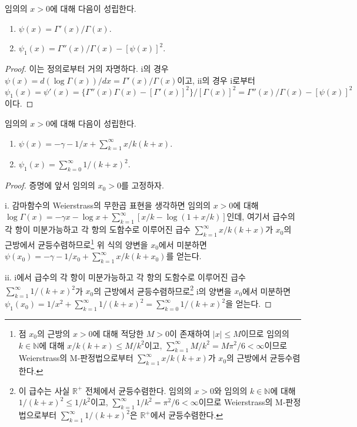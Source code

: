 \begin{proposition}
    임의의 $x>0$에 대해 다음이 성립한다.
    \begin{enumerate}
        \item $\psi(x)=\Gamma'(x)/\Gamma(x)$.
        \item $\psi_1(x)=\Gamma''(x)/\Gamma(x)-[\psi(x)]^2$.
    \end{enumerate}
\end{proposition}

\begin{proof}
    이는 정의로부터 거의 자명하다. i의 경우 $\psi(x)=d(\log\Gamma(x))/dx=\Gamma'(x)/\Gamma(x)$이고, ii의 경우 i로부터 $\psi_1(x)=\psi'(x)=\{\Gamma''(x)\Gamma(x)-[\Gamma'(x)]^2\}/[\Gamma(x)]^2=\Gamma''(x)/\Gamma(x)-[\psi(x)]^2$이다.
\end{proof}

\begin{theorem}
    임의의 $x>0$에 대해 다음이 성립한다.
    \begin{enumerate}
        \item $\psi(x)=-\gamma-1/x+\sum_{k=1}^\infty x/k(k+x)$.
        \item $\psi_1(x)=\sum_{k=0}^\infty1/(k+x)^2$.
    \end{enumerate}
\end{theorem}

\begin{proof}
    증명에 앞서 임의의 $x_0>0$를 고정하자.

    i. 감마함수의 Weierstrass의 무한곱 표현을 생각하면 임의의 $x>0$에 대해 $\log\Gamma(x)=-\gamma x-\log x+\sum_{k=1}^\infty[x/k-\log(1+x/k)]$인데, 여기서 급수의 각 항이 미분가능하고 각 항의 도함수로 이루어진 급수 $\sum_{k=1}^\infty x/k(k+x)$가 $x_0$의 근방에서 균등수렴하므로\footnote{
        점 $x_0$의 근방의 $x>0$에 대해 적당한 $M>0$이 존재하여 $|x|\leq M$이므로 임의의 $k\in\mathbb{N}$에 대해 $x/k(k+x)\leq M/k^2$이고, $\sum_{k=1}^\infty M/k^2=M\pi^2/6<\infty$이므로 Weierstrass의 M-판정법으로부터 $\sum_{k=1}^\infty x/k(k+x)$가 $x_0$의 근방에서 균등수렴한다.
    } 위 식의 양변을 $x_0$에서 미분하면 $\psi(x_0)=-\gamma-1/x_0+\sum_{k=1}^\infty x/k(k+x_0)$를 얻는다.

    ii. i에서 급수의 각 항이 미분가능하고 각 항의 도함수로 이루어진 급수 $\sum_{k=1}^\infty1/(k+x)^2$가 $x_0$의 근방에서 균등수렴하므로\footnote{
        이 급수는 사실 $\mathbb{R}^+$ 전체에서 균등수렴한다. 임의의 $x>0$와 임의의 $k\in\mathbb{N}$에 대해 $1/(k+x)^2\leq1/k^2$이고, $\sum_{k=1}^\infty 1/k^2=\pi^2/6<\infty$이므로 Weierstrass의 M-판정법으로부터 $\sum_{k=1}^\infty1/(k+x)^2$은 $\mathbb{R}^+$에서 균등수렴한다.
    } i의 양변을 $x_0$에서 미분하면 $\psi_1(x_0)=1/x^2+\sum_{k=1}^\infty1/(k+x)^2=\sum_{k=0}^\infty1/(k+x)^2$을 얻는다.
\end{proof}

